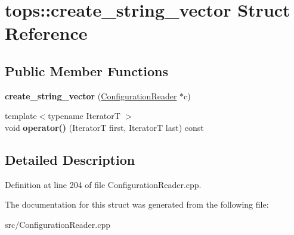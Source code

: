 \hypertarget{structtops_1_1create__string__vector}{}\section{tops\+:\+:create\+\_\+string\+\_\+vector Struct Reference}
\label{structtops_1_1create__string__vector}
\subsection*{Public Member Functions}
\begin{DoxyCompactItemize}
\item 
\mbox{\label{structtops_1_1create__string__vector_aae8b2515a30966b8d4ca7b6fb4c405b2}} 
{\bfseries create\+\_\+string\+\_\+vector} (\hyperlink{classtops_1_1ConfigurationReader}{Configuration\+Reader} $\ast$c)
\item 
\mbox{\label{structtops_1_1create__string__vector_a0dfc048c56865c00de2c82424fb71996}} 
{\footnotesize template$<$typename IteratorT $>$ }\\void {\bfseries operator()} (IteratorT first, IteratorT last) const
\end{DoxyCompactItemize}


\subsection{Detailed Description}


Definition at line 204 of file Configuration\+Reader.\+cpp.



The documentation for this struct was generated from the following file\+:\begin{DoxyCompactItemize}
\item 
src/Configuration\+Reader.\+cpp\end{DoxyCompactItemize}
